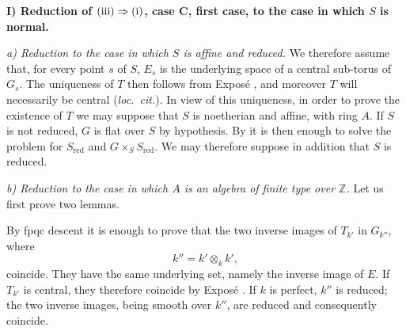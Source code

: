 \noindent\textbf{I) Reduction of
\(\textup{(iii)}\Rightarrow\textup{(i)}\), case C, first case, to
the case in which \(S\) is normal.}

\smallskip
\noindent\textit{a) Reduction to the case in which \(S\) is affine
and reduced.}\quad
We therefore assume that, for every point \(s\) of \(S\), \(E_s\)
is the underlying space of a central sub-torus of \(G_s\). The
uniqueness of \(T\) then follows from Exposé , and moreover
\(T\) will necessarily be central (\emph{loc.\ cit.}). In view of
this uniqueness, in order to prove the existence of \(T\) we may
suppose that \(S\) is noetherian and affine, with ring \(A\). If
\(S\) is not reduced, \(G\) is flat over \(S\) by hypothesis. By
 it is then enough to solve the problem for \(S_{\mathrm{red}}\)
and \(G\times_S S_{\mathrm{red}}\). We may therefore suppose in
addition that \(S\) is reduced.

\smallskip
\noindent\textit{b) Reduction to the case in which \(A\) is an
algebra of finite type over \(\mathbb Z\).}\quad
Let us first prove two lemmas.


By fpqc descent it is enough to prove that the two inverse images of
\(T_{k'}\) in \(G_{k''}\), where
\[
  k''=k'\otimes_k k',
\]
coincide. They have the same underlying set, namely the inverse image
of \(E\). If \(T_{k'}\) is
central, they therefore coincide by Exposé . If \(k\) is
perfect, \(k''\) is reduced; the two inverse images, being smooth
over \(k''\), are reduced and consequently coincide.


